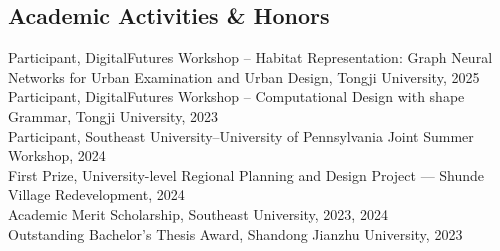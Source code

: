 \documentclass[10pt, letterpaper]{article}
\newenvironment{onecolentry}{\begin{adjustwidth}{0.2cm}{0.2cm}}{\end{adjustwidth}}
\begin{document}
\begin{CJK*}{UTF8}{gbsn}
\section{Academic Activities \& Honors}
\begin{onecolentry}
    Participant, DigitalFutures Workshop – Habitat Representation: Graph Neural Networks for Urban Examination and Urban Design, Tongji University, 2025\\[0.05cm]
    Participant, DigitalFutures Workshop – Computational Design with shape Grammar, Tongji University, 2023\\[0.05cm]
    Participant, Southeast University–University of Pennsylvania Joint Summer Workshop, 2024\\[0.05cm]
    First Prize, University-level Regional Planning and Design Project — Shunde Village Redevelopment, 2024\\ [0.05cm]
    Academic Merit Scholarship, Southeast University, 2023, 2024\\[0.05cm]
    Outstanding Bachelor's Thesis Award, Shandong Jianzhu University, 2023
\end{onecolentry}

\end{CJK*}
\end{document}
